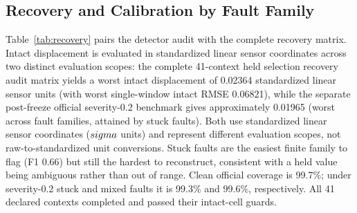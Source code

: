\subsection{\textbf{Recovery and Calibration by Fault Family}}
\CurrentRecoveryTable
Table~\ref{tab:recovery} pairs the detector audit with the complete recovery
matrix. Intact displacement is evaluated in standardized linear sensor coordinates across two distinct evaluation scopes: the complete 41-context held selection recovery audit matrix yields a worst intact displacement of 0.02364 standardized linear sensor units (with worst single-window intact RMSE 0.06821), while the separate post-freeze official severity-0.2 benchmark gives approximately 0.01965 (worst across fault families, attained by stuck faults). Both use standardized linear sensor coordinates ($\\sigma$ units) and represent different evaluation scopes, not raw-to-standardized unit conversions. Stuck faults are the easiest finite
family to flag (F1 0.66) but still the hardest to
reconstruct, consistent with a held value being ambiguous rather than out of
range. Clean official coverage is 99.7\%; under
severity-0.2 stuck and mixed faults it is
99.3\%
and 99.6\%, respectively.
All 41 declared contexts completed and passed their
intact-cell guards.
